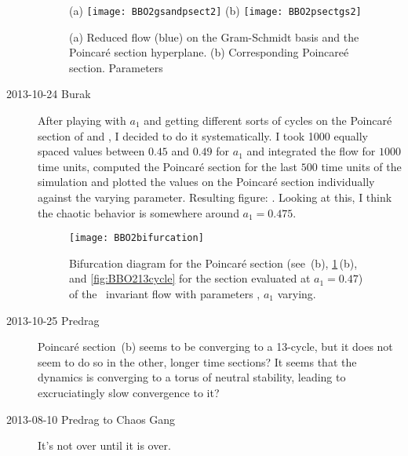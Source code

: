 \begin{description}
\begin{figure}[H]
\centering
 (a) \texttt{[image: BBO2gsandpsect2]}
 (b) \texttt{[image: BBO2psectgs2]}

\caption{(a) Reduced flow (blue) on the Gram-Schmidt basis and the Poincar\'e
section hyperplane. (b) Corresponding Poincare\'e section. Parameters 
}
\label{fig:BBO2Psect2}
\end{figure}


\item[2013-10-24 Burak] After playing with $a_1$ and getting different sorts
of cycles on the Poincar\'e section of  and ,
I decided to do it systematically. I took 1000 equally spaced values between
$0.45$ and $0.49$ for $a_1$ and integrated the flow for $1000$ time units,
computed the Poincar\'e section for the last $500$ time units of the simulation
and plotted the values on the Poincar\'e section individually against the varying parameter.
Resulting figure: . Looking at this, I think the
chaotic behavior is somewhere around $a_1 = 0.475$.

\begin{figure}%
  \begin{center}
  \texttt{[image: BBO2bifurcation]}
  \end{center}
  \caption{
Bifurcation diagram for the Poincar\'e section (see
\,(b), \ref{fig:BBO2Psect2}\,(b), and
\ref{fig:BBO213cycle} 	for the section
evaluated at $a_1 = 0.47$)
of the \ invariant flow with parameters ,
$a_1$ varying.
    }
  \label{fig:BBO2bifurcation}
\end{figure}

\item[2013-10-25 Predrag]
Poincar\'e section \,(b) seems to be converging to
a 13-cycle, but it does not seem to do so in the other, longer time
sections? It seems that the dynamics is converging to a torus of neutral
stability, leading to excruciatingly slow convergence to it?







\item[2013-08-10  Predrag to Chaos Gang] It's not over until it is over.
\end{description}
